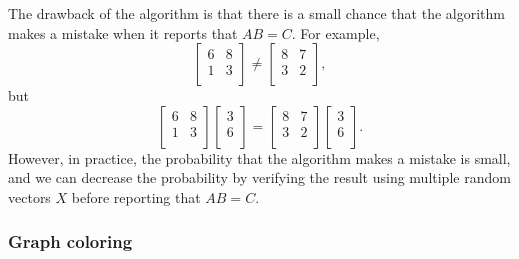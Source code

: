 The drawback of the algorithm is
that there is a small chance that the algorithm
makes a mistake when it reports that $AB=C$.
For example, 
\[
 \begin{bmatrix}
  6 & 8 \\
  1 & 3 \\
 \end{bmatrix}
\neq
 \begin{bmatrix}
  8 & 7 \\
  3 & 2 \\
 \end{bmatrix},
\]
but
\[
 \begin{bmatrix}
  6 & 8 \\
  1 & 3 \\
 \end{bmatrix}
 \begin{bmatrix}
  3 \\
  6 \\
 \end{bmatrix}
=
 \begin{bmatrix}
  8 & 7 \\
  3 & 2 \\
 \end{bmatrix}
 \begin{bmatrix}
  3 \\
  6 \\
 \end{bmatrix}.
\]
However, in practice, the probability that the
algorithm makes a mistake is small,
and we can decrease the probability by
verifying the result using multiple random vectors $X$
before reporting that $AB=C$.

\subsubsection{Graph coloring}


